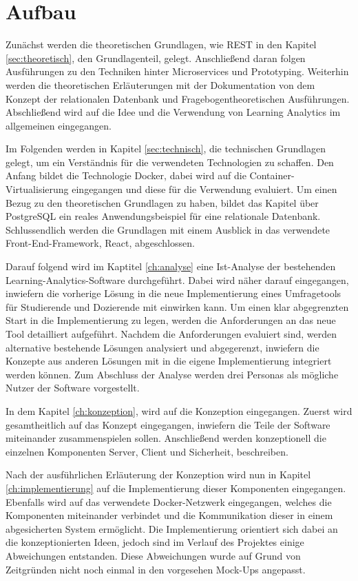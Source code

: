 \section{Aufbau}

Zunächst werden die theoretischen Grundlagen, wie \ac{REST} in den Kapitel \vref{sec:theoretisch}, den Grundlagenteil, gelegt.
Anschließend daran folgen Ausführungen zu den Techniken hinter Microservices und Prototyping.
Weiterhin werden die theoretischen Erläuterungen mit der Dokumentation von dem Konzept der relationalen Datenbank und Fragebogentheoretischen Ausführungen. 
Abschließend wird auf die Idee und die Verwendung von Learning Analytics im allgemeinen eingegangen. 

Im Folgenden werden in Kapitel \vref{sec:technisch}, die technischen Grundlagen gelegt, um ein Verständnis für die verwendeten Technologien zu schaffen. 
Den Anfang bildet die Technologie Docker, dabei wird auf die Container-Virtualisierung eingegangen und diese für die Verwendung evaluiert. %
Um einen Bezug zu den theoretischen Grundlagen zu haben, bildet das Kapitel über PostgreSQL ein reales Anwendungsbeispiel für eine relationale Datenbank.  
Schlussendlich werden die Grundlagen mit einem Ausblick in das verwendete Front-End-Framework, React, abgeschlossen. 

Darauf folgend wird im Kaptitel \vref{ch:analyse} eine Ist-Analyse der bestehenden Learning-Analytics-Software durchgeführt. 
Dabei wird näher darauf eingegangen, inwiefern die vorherige Lösung in die neue Implementierung eines Umfragetools für Studierende und Dozierende mit einwirken kann. 
Um einen klar abgegrenzten Start in die Implementierung zu legen, werden die Anforderungen an das neue Tool detailliert aufgeführt. 
Nachdem die Anforderungen evaluiert sind, werden alternative bestehende Lösungen analysiert und abgegerenzt, inwiefern die Konzepte aus anderen Lösungen mit in die eigene Implementierung integriert werden können. 
Zum Abschluss der Analyse werden drei Personas als mögliche Nutzer der Software vorgestellt.

In dem Kapitel \vref{ch:konzeption}, wird auf die Konzeption eingegangen. 
Zuerst wird gesamtheitlich auf das Konzept eingegangen, inwiefern die Teile der Software miteinander zusammenspielen sollen. 
Anschließend werden konzeptionell die einzelnen Komponenten Server, Client und Sicherheit, beschreiben. 

Nach der ausführlichen Erläuterung der Konzeption wird nun in Kapitel \vref{ch:implementierung} auf die Implementierung dieser Komponenten eingegangen. 
Ebenfalls wird auf das verwendete Docker-Netzwerk eingegangen, welches die Komponenten miteinander verbindet und die Kommunikation dieser in einem abgesicherten System ermöglicht.
Die Implementierung orientiert sich dabei an die konzeptionierten Ideen, jedoch sind im Verlauf des Projektes einige Abweichungen entstanden.
Diese Abweichungen wurde auf Grund von Zeitgründen nicht noch einmal in den vorgesehen Mock-Ups angepasst.

